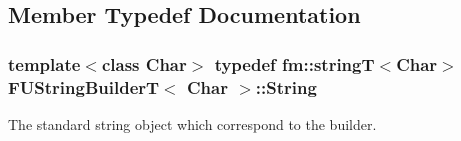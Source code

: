 \subsection{Member Typedef Documentation}
\hypertarget{classFUStringBuilderT_a2e14969ddb2b31c67625cb3b721d36c0}{
\subsubsection[{String}]{\setlength{\rightskip}{0pt plus 5cm}template$<$class Char$>$ typedef {\bf fm::stringT}$<$Char$>$ {\bf FUStringBuilderT}$<$ Char $>$::{\bf String}}}
\label{classFUStringBuilderT_a2e14969ddb2b31c67625cb3b721d36c0}
The standard string object which correspond to the builder. 


